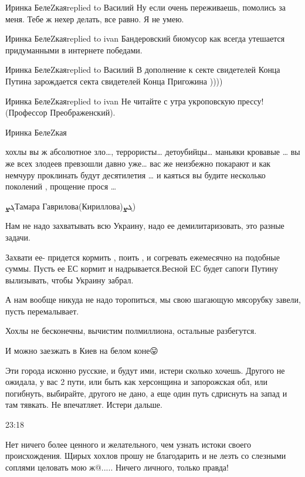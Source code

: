 Иринка БелеZкаяreplied to Василий
Ну если очень переживаешь, помолись за меня. Тебе ж нехер делать, все равно. Я не умею.

Иринка БелеZкаяreplied to ivan
Бандеровский биомусор как всегда утешается придуманными в интернете победами.

Иринка БелеZкаяreplied to Василий
В дополнение к секте свидетелей Конца Путина зарождается секта свидетелей Конца Пригожина ))))

Иринка БелеZкаяreplied to ivan
Не читайте с утра укроповскую прессу! (Профессор Преображенский).

Иринка БелеZкая

хохлы вы ж абсолютное зло…, террористы… детоубийцы… маньяки кровавые … вы же
всех злодеев превзошли давно уже… вас же неизбежно покарают и как немчуру
проклинать будут десятилетия … и каяться вы будите несколько поколений ,
прощение прося …


ܓܨТамара Гаврилова(Кириллова)ܓܨ)

Нам не надо захватывать всю Украину, надо ее демилитаризовать, это разные
задачи.

Захвати ее- придется кормить , поить , и согревать ежемесячно на подобные
суммы. Пусть ее ЕС кормит и надрывается.Весной ЕС будет сапоги Путину
вылизывать, чтобы Украину забрал.

А нам вообще никуда не надо торопиться, мы свою шагающую мясорубку завели,
пусть перемалывает.

Хохлы не бесконечны, вычистим полмиллиона, остальные разбегутся.

И можно заезжать в Киев на белом коне😛


Эти города исконно русские, и будут ими, истери сколько хочешь. Другого не
ожидала, у вас 2 пути, или быть как херсонщина и запорожская обл, или
погибнуть, выбирайте, другого не дано, а еще один путь сдриснуть на запад и там
тявкать. Не впечатляет. Истери дальше.

23:18

Нет ничего более ценного и желательного, чем узнать истоки своего
происхождения. Щирых хохлов прошу не благодарить и не лезть со слезными соплями
целовать мою ж@..... Ничего личного, только правда!

